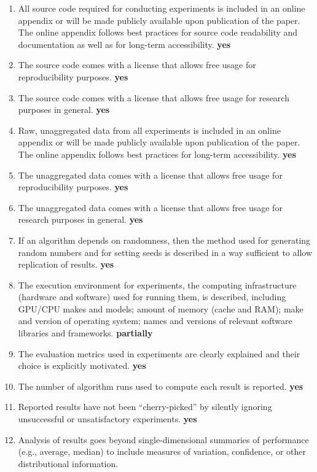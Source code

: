 \documentclass[manuscript, screen, review]{jair}
\begin{document}
\begin{enumerate}
    \item
    All source code required for conducting experiments is included in an online appendix
    or will be made publicly available upon publication of the paper.
    The online appendix follows best practices for source code readability and documentation as well as for long-term accessibility.
    \textbf{yes}
    \item The source code comes with a license that
    allows free usage for reproducibility purposes.
    \textbf{yes}
    \item The source code comes with a license that
    allows free usage for research purposes in general.
    \textbf{yes}
    \item
    Raw, unaggregated data from all experiments is included in an online appendix
    or will be made publicly available upon publication of the paper.
    The online appendix follows best practices for long-term accessibility.
    \textbf{yes}
    \item The unaggregated data comes with a license that
    allows free usage for reproducibility purposes.
    \textbf{yes}
    \item The unaggregated data comes with a license that
    allows free usage for research purposes in general.
    \textbf{yes}
    \item If an algorithm depends on randomness, then the method used for generating random numbers and for setting seeds is described in a way sufficient to allow replication of results.
    \textbf{yes}
    \item The execution environment for experiments, the computing infrastructure (hardware and software) used for running them, is described, including GPU/CPU makes and models; amount of memory (cache and RAM); make and version of operating system; names and versions of relevant software libraries and frameworks.
    \textbf{partially}
    \item
    The evaluation metrics used in experiments are clearly explained and their choice is explicitly motivated.
    \textbf{yes}
    \item
    The number of algorithm runs used to compute each result is reported.
    \textbf{yes}
    \item
    Reported results have not been ``cherry-picked'' by silently ignoring unsuccessful or unsatisfactory experiments.
    \textbf{yes}
    \item
    Analysis of results goes beyond single-dimensional summaries of performance (e.g., average, median) to include measures of variation, confidence, or other distributional information.

\end{enumerate}
\end{document}
